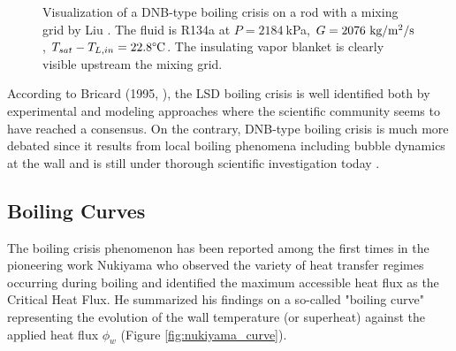 \begin{figure}[!h]
\centering
{}
\caption{Visualization of a DNB-type boiling crisis on a rod with a mixing grid by Liu \etal \cite{liu_critical_2021}. The fluid is R134a at $P=2184~$kPa, $G = 2076~\text{kg/m$^{2}$/s}$ , $T_{sat} - T_{L,in} = 22.8 \degree\mathrm{C}$. The insulating vapor blanket is clearly visible upstream the mixing grid.}
\label{fig:dnb_liu}
\end{figure}

\npar

According to Bricard (1995, \cite{bricard_modelisation_1995}), the LSD boiling crisis is well identified both by experimental and modeling approaches \cite{hewitt_phenomenological_1990} where the scientific community seems to have reached a consensus. On the contrary, DNB-type boiling crisis is much more debated since it results from local boiling phenomena including bubble dynamics at the wall and is still under thorough scientific investigation today \cite{kossolapov_experimental_2021, demarly_new_2020, richenderfer_experimental_2018, bloch_study_2016, bloch_phenomenological_2013}.


\subsection{Boiling Curves}

The boiling crisis phenomenon has been reported among the first times in the pioneering work Nukiyama \cite{nukiyama_maximum_1966} who observed the variety of heat transfer regimes occurring during boiling and identified the maximum accessible heat flux as the Critical Heat Flux. He summarized his findings on a so-called "boiling curve" representing the evolution of the wall temperature (or superheat) against the applied heat flux $\phi_{w}$ (Figure \ref{fig:nukiyama_curve}).

